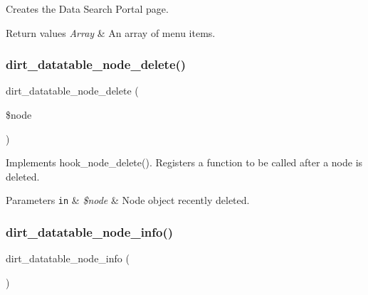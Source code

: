 Creates the Data Search Portal page.


\begin{DoxyRetVals}{Return values}
{\em Array} & An array of menu items. \\
\hline
\end{DoxyRetVals}
\mbox{\label{dirt__datatable_8module_aa9b9348e81b8b2f34a97a1124de44c7e}} 
\subsubsection{\texorpdfstring{dirt\+\_\+datatable\+\_\+node\+\_\+delete()}{dirt\_datatable\_node\_delete()}}
{\footnotesize\ttfamily dirt\+\_\+datatable\+\_\+node\+\_\+delete (\begin{DoxyParamCaption}\item[{}]{\$node }\end{DoxyParamCaption})}

Implements hook\+\_\+node\+\_\+delete(). Registers a function to be called after a node is deleted.


\begin{DoxyParams}[1]{Parameters}
\mbox{\tt in}  & {\em \$node} & Node object recently deleted. \\
\hline
\end{DoxyParams}
\mbox{\label{dirt__datatable_8module_a873e280c8a3fce75771fa7b497ef4b2a}} 
\subsubsection{\texorpdfstring{dirt\+\_\+datatable\+\_\+node\+\_\+info()}{dirt\_datatable\_node\_info()}}
{\footnotesize\ttfamily dirt\+\_\+datatable\+\_\+node\+\_\+info (\begin{DoxyParamCaption}{ }\end{DoxyParamCaption})}

